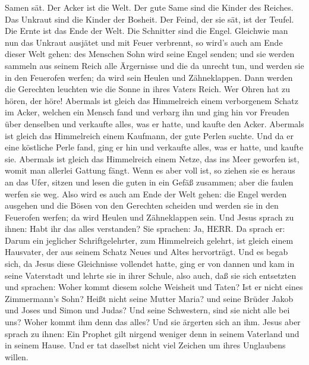 Samen sät.  Der Acker ist die Welt. Der gute Same sind die
Kinder des Reiches. Das Unkraut sind die Kinder der Bosheit.
 Der Feind, der sie sät, ist der Teufel. Die Ernte ist das
Ende der Welt. Die Schnitter sind die Engel.  Gleichwie man
nun das Unkraut ausjätet und mit Feuer verbrennt, so wird's auch am Ende
dieser Welt gehen:  des Menschen Sohn wird seine Engel
senden; und sie werden sammeln aus seinem Reich alle Ärgernisse und die
da unrecht tun,  und werden sie in den Feuerofen werfen; da
wird sein Heulen und Zähneklappen.  Dann werden die
Gerechten leuchten wie die Sonne in ihres Vaters Reich. Wer Ohren hat zu
hören, der höre!  Abermals ist gleich das Himmelreich einem
verborgenem Schatz im Acker, welchen ein Mensch fand und verbarg ihn und
ging hin vor Freuden über denselben und verkaufte alles, was er hatte,
und kaufte den Acker.  Abermals ist gleich das Himmelreich
einem Kaufmann, der gute Perlen suchte.  Und da er eine
köstliche Perle fand, ging er hin und verkaufte alles, was er hatte, und
kaufte sie.  Abermals ist gleich das Himmelreich einem
Netze, das ins Meer geworfen ist, womit man allerlei Gattung fängt.
 Wenn es aber voll ist, so ziehen sie es heraus an das
Ufer, sitzen und lesen die guten in ein Gefäß zusammen; aber die faulen
werfen sie weg.  Also wird es auch am Ende der Welt gehen:
die Engel werden ausgehen und die Bösen von den Gerechten scheiden
 und werden sie in den Feuerofen werfen; da wird Heulen und
Zähneklappen sein.  Und Jesus sprach zu ihnen: Habt ihr das
alles verstanden? Sie sprachen: Ja, HERR.  Da sprach er:
Darum ein jeglicher Schriftgelehrter, zum Himmelreich gelehrt, ist
gleich einem Hausvater, der aus seinem Schatz Neues und Altes
hervorträgt.  Und es begab sich, da Jesus diese Gleichnisse
vollendet hatte, ging er von dannen  und kam in seine
Vaterstadt und lehrte sie in ihrer Schule, also auch, daß sie sich
entsetzten und sprachen: Woher kommt diesem solche Weisheit und Taten?
 Ist er nicht eines Zimmermann's Sohn? Heißt nicht seine
Mutter Maria? und seine Brüder Jakob und Joses und Simon und Judas?
 Und seine Schwestern, sind sie nicht alle bei uns? Woher
kommt ihm denn das alles?  Und sie ärgerten sich an ihm.
Jesus aber sprach zu ihnen: Ein Prophet gilt nirgend weniger denn in
seinem Vaterland und in seinem Hause.  Und er tat daselbst
nicht viel Zeichen um ihres Unglaubens willen.

